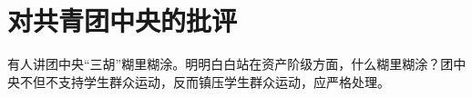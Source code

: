 \section[对共青团中央的批评（一九六六年七月）]{对共青团中央的批评}


有人讲团中央“三胡”糊里糊涂。明明白白站在资产阶级方面，什么糊里糊涂？团中央不但不支持学生群众运动，反而镇压学生群众运动，应严格处理。

